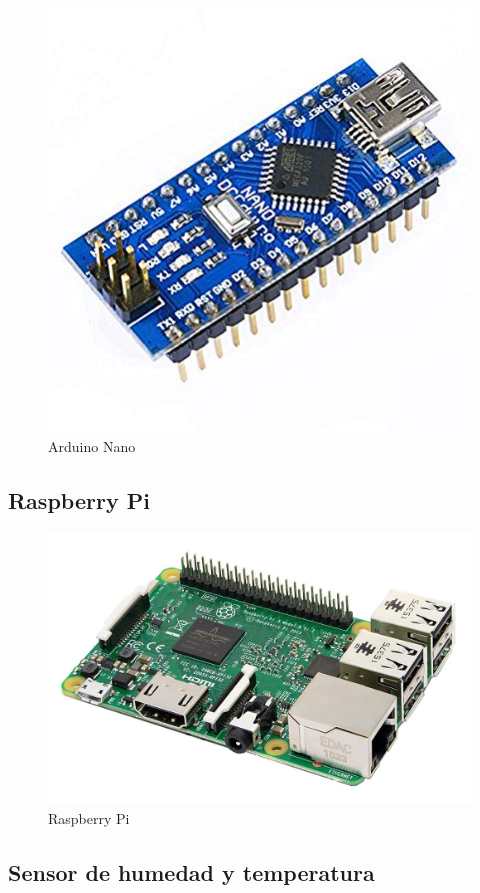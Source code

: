 \documentclass[12pt]{article}
\begin{document}
\begin{figure}[H]
	\centering
	\includegraphics[scale=.35]{arduino}
	\caption{Arduino Nano}
	\label{fig:Arduino Nano}
\end{figure}

\subsection{Raspberry Pi}

\begin{figure}[H]
	\centering
	\includegraphics[scale=.16]{raspberry}
	\caption{Raspberry Pi}
	\label{fig:raspberry}
\end{figure}

\subsection{Sensor de humedad y temperatura}
\end{document}

